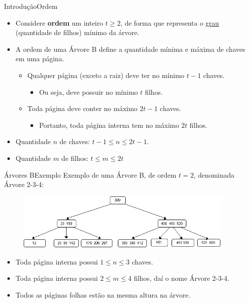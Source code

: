 \documentclass[aspectratio=169]{beamer}
\begin{document}
\begin{frame}{Introdução}{Ordem}
\begin{itemize}
\item Considere {\bf ordem} um inteiro $t \geq 2$, de forma que representa o \underline{grau} (quantidade de filhos) mínimo da árvore. 
\item A ordem de uma Árvore B define a quantidade mínima e máxima de chaves em uma página.
\begin{itemize}
\item Qualquer página (exceto a raiz) deve ter no mínimo {\bf $t-1$} chaves. 
\begin{itemize}
\item Ou seja, deve possuir no mínimo {\bf $t$} filhos.
\end{itemize}
\item Toda página deve conter no máximo {\bf $2t-1$} chaves. 
\begin{itemize}
\item Portanto, toda página interna tem no máximo {\bf $2t$} filhos.
\end{itemize}
\end{itemize}
\item Quantidade $n$ de chaves: $t-1 \leq n \leq 2t-1$.
\item Quantidade $m$ de filhos: $t \leq m \leq 2t$
\end{itemize}
\end{frame}


\begin{frame}{Árvores B}{Exemplo}
Exemplo de uma Árvore B, de ordem $t=2$, denominada Árvore 2-3-4:
\begin{figure}[!h]
  \centering
   \includegraphics[width=300pt]{imagens/exemplo1-arvore-b.png}
  \label{fig_exemplo1-arvore-b}
\end{figure} 
\begin{itemize}
 \item Toda página interna possui $1\leq n \leq 3$ chaves.
 \item Toda página interna possui $2\leq m \leq 4$ filhos, daí o nome Árvore 2-3-4.
 \item Todos as páginas folhas estão na mesma altura na árvore.
\end{itemize}
\end{frame}
\end{document}
